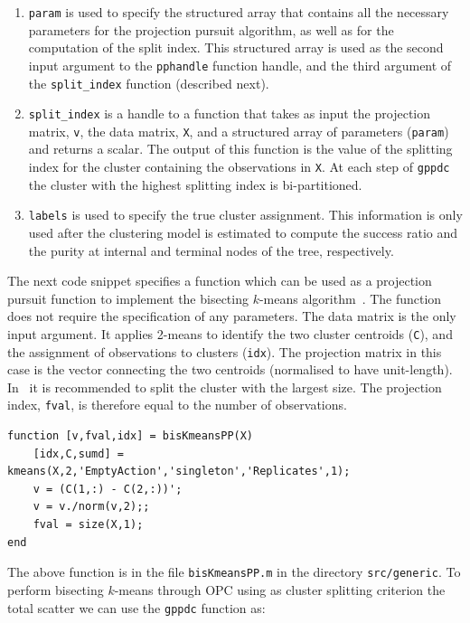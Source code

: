 \documentclass{book}
\begin{document}
\begin{enumerate}

\item {\tt param} is used to specify the structured array that contains
all the necessary parameters for the projection pursuit
algorithm, as well as for the computation of the split index.
%
This structured array is used as
the second input argument to the {\tt pphandle} function handle, and
the third argument of the {\tt split\_index} function (described next).

\item {\tt split\_index} is a handle to a function that takes as input the
projection matrix, {\tt v}, the data matrix, {\tt X}, and a structured array of
parameters ({\tt param}) and returns a scalar. The output of this function is
the value of the splitting index for the cluster containing the observations in
{\tt X}.
%
At each step of {\tt gppdc} the cluster with the highest splitting index is
bi-partitioned. 

\item {\tt labels} is used to specify the true cluster assignment. This
information is only used after the clustering model is estimated to compute the
success ratio and the purity at internal and terminal nodes of the tree,
respectively.

\end{enumerate}

The next code snippet specifies a function which can be used as a projection
pursuit function to implement the bisecting $k$-means
algorithm~\cite{SteinbachKK2000}. The function does not require the specification 
of any parameters. The data matrix is the only input argument.
It applies 2-means to identify the two cluster centroids ({\tt C}),
and the assignment of observations to clusters ({\tt idx}).
The projection matrix in this case is the vector connecting the two centroids
(normalised to have unit-length). In~\cite{SteinbachKK2000} it is recommended to
split the cluster with the largest size. The projection index, {\tt fval},
is therefore equal to the number of observations.


\begin{lstlisting}
function [v,fval,idx] = bisKmeansPP(X)
	[idx,C,sumd] = kmeans(X,2,'EmptyAction','singleton','Replicates',1);
	v = (C(1,:) - C(2,:))';
	v = v./norm(v,2);;
	fval = size(X,1);
end
\end{lstlisting}


\noindent
%
The above function is in the file {\tt bisKmeansPP.m} in the directory {\tt src/generic}.
To perform bisecting $k$-means through OPC using as cluster splitting criterion 
the total scatter we can use the {\tt gppdc} function as:
\end{document}
